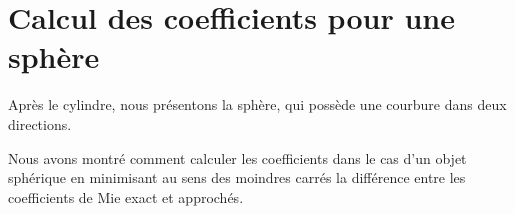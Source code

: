 \chapter{Calcul des coefficients pour une sphère}
\label{sec:sphere}
\minitoc
\newpage
{}
Après le cylindre, nous présentons la sphère, qui possède une courbure dans deux directions.






Nous avons montré comment calculer les coefficients dans le cas d'un objet sphérique en minimisant au sens des moindres carrés la différence entre les coefficients de Mie exact et approchés. 


